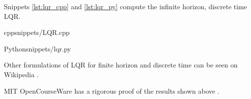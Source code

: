Snippets \ref{lst:lqr_cpp} and \ref{lst:lqr_py} compute the infinite horizon,
discrete time LQR.
\begin{coderemote}{cpp}{snippets/LQR.cpp}
  \caption{Infinite horizon, discrete time LQR solver in C++ (see subsection
    \ref{subsec:dare} for DARE solver)}
  \label{lst:lqr_cpp}
\end{coderemote}
\begin{coderemote}{Python}{snippets/lqr.py}
  \caption{Infinite horizon, discrete time LQR solver in Python}
  \label{lst:lqr_py}
\end{coderemote}

Other formulations of LQR for finite horizon and discrete time can be seen on
Wikipedia \cite{bib:wiki_lqr}.

MIT OpenCourseWare has a rigorous proof of the results shown above
\cite{bib:lqr_derivs}.
